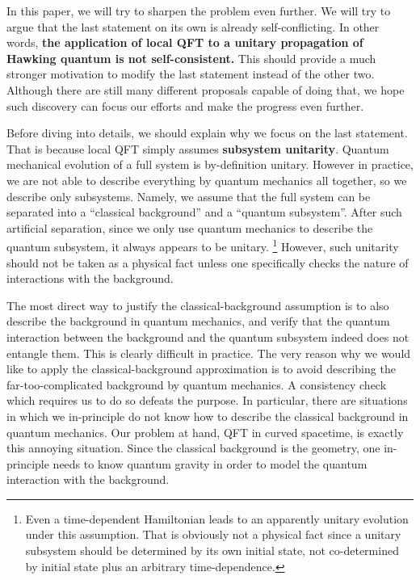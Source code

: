 \documentclass[aps,showpacs,twocolumn,floats,prd,superscriptaddress,nofootinbib]{revtex4-1}
\begin{document}
In this paper, we will try to sharpen the problem even further. 
We will try to argue that the last statement on its own is already self-conflicting. 
In other words, {\bf the application of local QFT to a unitary propagation of Hawking quantum is not self-consistent. } 
This should provide a much stronger motivation to modify the last statement instead of the other two. 
Although there are still many different proposals capable of doing that, we hope such discovery can focus our efforts and make the progress even further.

Before diving into details, we should explain why we focus on the last statement.
That is because local QFT simply assumes {\bf subsystem unitarity}.
Quantum mechanical evolution of a full system is by-definition unitary. 
However in practice, we are not able to describe everything by quantum mechanics all together, so we describe only subsystems. 
Namely, we assume that the full system can be separated into a ``classical background'' and a ``quantum subsystem''. 
After such artificial separation, since we only use quantum mechanics to describe the quantum subsystem, it always appears to be unitary.
\footnote{Even a time-dependent Hamiltonian leads to an apparently unitary evolution under this assumption. That is obviously not a physical fact since a unitary subsystem should be determined by its own initial state, not co-determined by initial state plus an arbitrary time-dependence.} 
However, such unitarity should not be taken as a physical fact unless one specifically checks the nature of interactions with the background.

The most direct way to justify the classical-background assumption is to also describe the background in quantum mechanics, and verify that the quantum interaction between the background and the quantum subsystem indeed does not entangle them. 
This is clearly difficult in practice. 
The very reason why we would like to apply the classical-background approximation is to avoid describing the far-too-complicated background by quantum mechanics. 
A consistency check which requires us to do so defeats the purpose. 
In particular, there are situations in which we in-principle do not know how to describe the classical background in quantum mechanics. 
Our problem at hand, QFT in curved spacetime, is exactly this annoying situation. 
Since the classical background is the geometry, one in-principle needs to know quantum gravity in order to model the quantum interaction with the background. 
\end{document}
